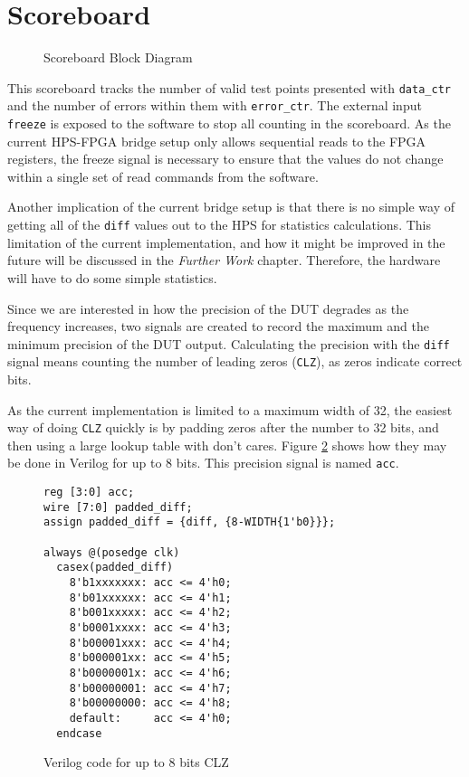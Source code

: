 \section{Scoreboard}

\begin{figure}[H]
  \centering
  
  \caption{Scoreboard Block Diagram}
  \label{ScoreboardBlk}
\end{figure}

This scoreboard tracks the number of valid test points presented with \texttt{data\_ctr} and the number of errors within them with \texttt{error\_ctr}.
The external input \texttt{freeze} is exposed to the software to stop all counting in the scoreboard.
As the current HPS-FPGA bridge setup only allows sequential reads to the FPGA registers, the freeze signal is necessary to ensure that the values do not change within a single set of read commands from the software.

Another implication of the current bridge setup is that there is no simple way of getting all of the \texttt{diff} values out to the HPS for statistics calculations.
This limitation of the current implementation, and how it might be improved in the future will be discussed in the \textit{Further Work} chapter.
Therefore, the hardware will have to do some simple statistics.

Since we are interested in how the precision of the DUT degrades as the frequency increases, two signals are created to record the maximum and the minimum precision of the DUT output.
Calculating the precision with the \texttt{diff} signal means counting the number of leading zeros (\texttt{CLZ}), as zeros indicate correct bits.

As the current implementation is limited to a maximum width of 32, the easiest way of doing \texttt{CLZ} quickly is by padding zeros after the number to 32 bits, and then using a large lookup table with don't cares.
Figure \ref{CLZVeri} shows how they may be done in Verilog for up to 8 bits.
This precision signal is named \texttt{acc}.

\begin{figure}[H]
  \centering
  \begin{minipage}[b]{.7\linewidth}
  \begin{verbatim}
reg [3:0] acc;
wire [7:0] padded_diff;
assign padded_diff = {diff, {8-WIDTH{1'b0}}};

always @(posedge clk)
  casex(padded_diff)
    8'b1xxxxxxx: acc <= 4'h0;
    8'b01xxxxxx: acc <= 4'h1;
    8'b001xxxxx: acc <= 4'h2;
    8'b0001xxxx: acc <= 4'h3;
    8'b00001xxx: acc <= 4'h4;
    8'b000001xx: acc <= 4'h5;
    8'b0000001x: acc <= 4'h6;
    8'b00000001: acc <= 4'h7;
    8'b00000000: acc <= 4'h8;
    default:     acc <= 4'h0;
  endcase
  \end{verbatim}
  \caption{Verilog code for up to 8 bits CLZ}
  \label{CLZVeri}
  \end{minipage}
\end{figure}

